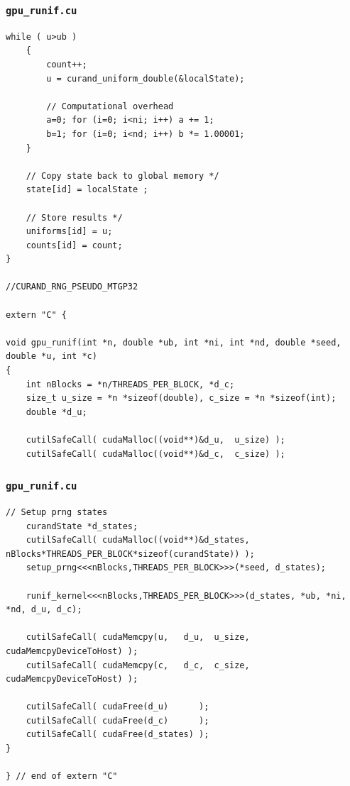 \documentclass[handout]{beamer}
\numberwithin{equation}{section}
\begin{document}
\begin{frame}[fragile]
\frametitle{{\tt gpu\_runif.cu}} \lstset{basicstyle=\tiny}
\begin{lstlisting}[name=gpurunif]
 while ( u>ub ) 
    {
        count++;
        u = curand_uniform_double(&localState);

        // Computational overhead
        a=0; for (i=0; i<ni; i++) a += 1; 
        b=1; for (i=0; i<nd; i++) b *= 1.00001;
    }

    // Copy state back to global memory */
    state[id] = localState ;

    // Store results */
    uniforms[id] = u;
    counts[id] = count;
}

//CURAND_RNG_PSEUDO_MTGP32

extern "C" {

void gpu_runif(int *n, double *ub, int *ni, int *nd, double *seed, double *u, int *c) 
{
    int nBlocks = *n/THREADS_PER_BLOCK, *d_c;
    size_t u_size = *n *sizeof(double), c_size = *n *sizeof(int);
    double *d_u;

    cutilSafeCall( cudaMalloc((void**)&d_u,  u_size) );
    cutilSafeCall( cudaMalloc((void**)&d_c,  c_size) );
\end{lstlisting}
\end{frame}


\begin{frame}[fragile]
\frametitle{{\tt gpu\_runif.cu}}  \lstset{basicstyle=\tiny}
\begin{lstlisting}[name=gpurunif]
    // Setup prng states
    curandState *d_states;
    cutilSafeCall( cudaMalloc((void**)&d_states, nBlocks*THREADS_PER_BLOCK*sizeof(curandState)) );
    setup_prng<<<nBlocks,THREADS_PER_BLOCK>>>(*seed, d_states);

    runif_kernel<<<nBlocks,THREADS_PER_BLOCK>>>(d_states, *ub, *ni, *nd, d_u, d_c);
 
    cutilSafeCall( cudaMemcpy(u,   d_u,  u_size, cudaMemcpyDeviceToHost) );
    cutilSafeCall( cudaMemcpy(c,   d_c,  c_size, cudaMemcpyDeviceToHost) );

    cutilSafeCall( cudaFree(d_u)      );
    cutilSafeCall( cudaFree(d_c)      );
    cutilSafeCall( cudaFree(d_states) );
}

} // end of extern "C"
\end{lstlisting}
\end{frame}
\end{document}
